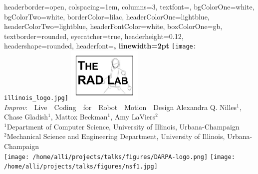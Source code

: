 \documentclass[landscape,a0paper,fontscale=0.3]{baposter} %
\begin{document}
\begin{poster}
{
headerborder=open, %
colspacing=1em, %
columns=3,
textfont=\Large,
bgColorOne=white, %
bgColorTwo=white, %
borderColor=lilac, %
headerColorOne=lightblue, %
headerColorTwo=lightblue, %
headerFontColor=white, %
boxColorOne=gb, %
textborder=rounded, %
eyecatcher=true, %
headerheight=0.12\textheight, %
headershape=rounded, %
headerfont=\Large\bf\textsc, %
linewidth=2pt %
}
%
{\texttt{[image: illinois\_logo.jpg]}%
\includegraphics[height=7em]{RAD_lab_logo.png}
} %
{\emph{Improv}:~~Live~~Coding~~for~~Robot~~Motion~~Design \vspace{-0.0em}} %
{Alexandra Q. Nilles$^1$, Chase Gladish$^1$, Mattox Beckman$^1$, Amy LaViers$^2$ \\
$^1$Department of Computer Science, University of Illinois, Urbana-Champaign \\
$^2$Mechanical Science and Engineering Department, University of Illinois, Urbana-Champaign \\
} %
{\texttt{[image: /home/alli/projects/talks/figures/DARPA-logo.png]}%
\texttt{[image: /home/alli/projects/talks/figures/nsf1.jpg]}} %


\end{poster}
\end{document}
